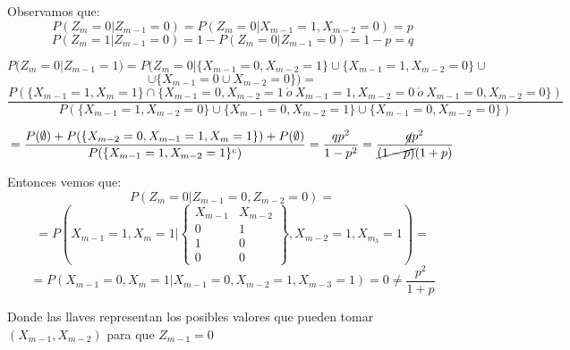 \documentclass[openany]{book}
\begin{document}
\begin{exercise}
    Observamos que:
    $$ P(Z_m = 0 |Z_{m-1} = 0) = P(Z_m = 0| X_{m-1} = 1,X_{m-2} = 0) = p $$
    $$ P(Z_m = 1 | Z_{m-1} = 0) = 1-P(Z_m = 0 |Z_{m-1} = 0) = 1-p = q $$

    $$ P(Z_m = 0|Z_{m-1} = 1) = P(Z_m = 0|\{X_{m-1} = 0,X_{m-2} = 1\} \cup \{X_{m-1} = 1,X_{m-2} = 0\}\cup $$  
    $$\cup \{X_{m-1}=0\cup X_{m-2} = 0\}) = $$  
    $$\dfrac{P(\{X_{m-1} = 1,X_m = 1\}\cap \{X_{m-1} = 0,X_{m-2} = 1\ \acute o\ X_{m-1} = 1,X_{m-2} = 0\ \acute o\ X_{m-1} = 0,X_{m-2} = 0\})}{P(\{X_{m-1}=1,X_{m-2}=0\}\cup\{X_{m-1}=0,X_{m-2}=1\}\cup \{X_{m-1}=0,X_{m-2}=0\})} $$

    $$ = \dfrac{P(\emptyset)+P(\{X_{m-2}=0,X_{m-1}=1,X_{m}=1\}) + P(\emptyset)}{P(\{X_{m-1} = 1,X_{m-2} =1\}^{c})} = \dfrac{qp^2}{1-p^2} = \dfrac{\cancel{q}p^2}{\cancel{(1-p)}(1+p)}$$
    
    Entonces vemos que:
    $$ P(Z_m = 0|Z_{m-1} = 0,Z_{m-2} = 0) = $$  
    $$=  P\left(X_{m-1}=1,X_m = 1 \Biggr| \left\{
    \begin{array}{cc}
        X_{m-1} & X_{m-2}\\0 & 1\\ 1 & 0 \\ 0 & 0
    \end{array}
    \right\},X_{m-2} = 1,X_{m_3} = 1\right) =$$ 
    $$=P(X_{m-1} = 0,X_{m}=1|X_{m-1} = 0,X_{m-2} = 1,X_{m-3} = 1) = 0 \ne \dfrac{p^2}{1+p} $$

    Donde las llaves representan los posibles valores que pueden tomar $ (X_{m-1},X_{m-2}) $ para que $ Z_{m-1} = 0 $

    
\end{exercise}
\end{document}
